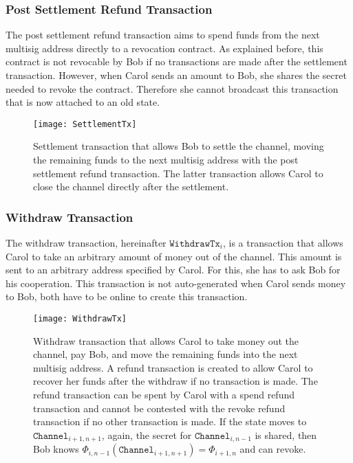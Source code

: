 \documentclass{llncs}
\begin{document}
\subsubsection{Post Settlement Refund Transaction} The post settlement refund
transaction aims to spend funds from the next multisig address directly to a
revocation contract. As explained before, this contract is not revocable by Bob
if no transactions are made after the settlement transaction. However, when
Carol sends an amount to Bob, she shares the secret needed to revoke the
contract. Therefore she cannot broadcast this transaction that is now attached
to an old state.

\begin{figure}[t] \centering \texttt{[image: SettlementTx]}
  \caption{Settlement transaction that allows Bob to settle the channel, moving
the remaining funds to the next multisig address with the post settlement refund
transaction. The latter transaction allows Carol to close the channel directly
after the settlement.}
\end{figure}

\subsubsection{Withdraw Transaction} The withdraw transaction, hereinafter
$\texttt{WithdrawTx}_{i}$, is a transaction that allows Carol to take an
arbitrary amount of money out of the channel. This amount is sent to an
arbitrary address specified by Carol. For this, she has to ask Bob for his
cooperation. This transaction is not auto-generated when Carol sends money to
Bob, both have to be online to create this transaction.

\begin{figure}[t] \centering \texttt{[image: WithdrawTx]}
  \caption{Withdraw transaction that allows Carol to take money out the channel,
pay Bob, and move the remaining funds into the next multisig address. A refund
transaction is created to allow Carol to recover her funds after the withdraw if
no transaction is made. The refund transaction can be spent by Carol with a
spend refund transaction and cannot be contested with the revoke refund
transaction if no other transaction is made. If the state moves to
$\texttt{Channel}_{i+1,n+1}$, again, the secret for $\texttt{Channel}_{i,n-1}$
is shared, then Bob knows $\Phi_{i,n-1}(\texttt{Channel}_{i+1,n+1}) =
\Phi_{i+1,n}$ and can revoke.}
\end{figure}
\end{document}
